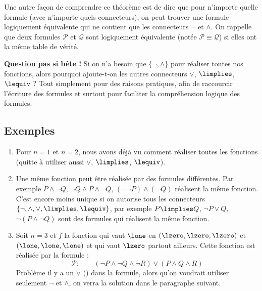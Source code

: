 \documentclass[11pt,class=report,crop=false]{standalone}
\begin{document}
Une autre façon de comprendre ce théorème est de dire que pour n'importe quelle formule (avec n'importe quels connecteurs), on peut trouver une formule logiquement équivalente qui ne contient que les connecteurs $\lnot$ et $\land$. On rappelle que deux formules $\mathcal{P}$ et $\mathcal{Q}$ sont logiquement équivalente (notée $\mathcal{P} \equiv \mathcal{Q}$) si elles ont la même table de vérité.

\textbf{Question pas si bête !}
Si on n'a besoin que $\{\lnot, \land\}$ pour réaliser toutes nos fonctions, alors pourquoi ajoute-t-on les autres connecteurs $\lor$, $\limplies$, $\lequiv$ ?
Tout simplement pour des raisons pratiques, afin de raccourcir l'écriture des formules et surtout pour faciliter la compréhension logique des formules.

\subsection{Exemples}

\begin{enumerate}
	\item Pour $n=1$ et $n=2$, nous avons déjà vu comment réaliser toutes les fonctions (quitte à utiliser aussi $\lor$, $\limplies$, $\lequiv$).
	
	\item Une même fonction peut être réalisée par des formules différentes.
	Par exemple $P \land \lnot Q$, $\lnot Q \land P \land \lnot Q$, $(\lnot \lnot P) \land (\lnot Q)$ réalisent la même fonction.
	C'est encore moins unique si on autorise tous les connecteurs $\{\lnot, \land, \lor, \limplies, \lequiv\}$, par exemple $P \limplies Q$, $\lnot P \lor Q$, $\lnot (P \land \lnot Q)$ sont des formules qui réalisent la même fonction.
	
	\item Soit $n=3$ et $f$ la fonction qui vaut $\lone$ en $(\lzero,\lzero,\lzero)$ et $(\lone,\lone,\lone)$ et qui vaut $\lzero$ partout ailleurs. Cette fonction est réalisée par la formule :
	\[
	\mathcal{P} : \qquad (\lnot P \land \lnot Q \land \lnot R) \lor (P \land Q \land R)
	\]
	Problème il y a un $\lor$ (\tor) dans la formule, alors qu'on voudrait utiliser seulement $\lnot$ et 
	$\land$, on verra la solution dans le paragraphe suivant.
\end{enumerate}


\end{document}
